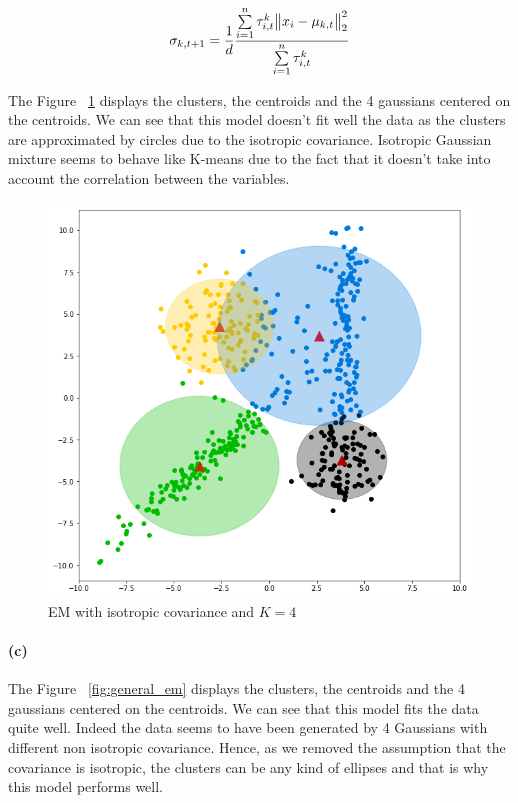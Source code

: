 \documentclass[11pt]{article}
\numberwithin{figure}{section} %
\begin{document}
\begin{framed}
\begin{align*}
\sigma_{k,t+1} = \frac{1}{d}\frac{\sum\limits_{i=1}^n \tau^{k}_{i,t} \norm{x_i - \mu_{k,t}}^2_2}{\sum\limits_{i=1}^n \tau^{k}_{i,t}}
\end{align*}
\end{framed}


The Figure ~\ref{fig:isotropic_em} displays the clusters, the centroids and the 4 gaussians centered on the centroids. We can see that this model doesn't fit well the data as the clusters are approximated by circles due to the isotropic covariance. Isotropic Gaussian mixture seems to behave like K-means due to the fact that it doesn't take into account the correlation between the variables.

\begin{figure}[H] 
	\centering
	\includegraphics[scale=0.5]{images/isotropic_em.png} %
	\caption{EM with isotropic covariance and $K=4$}
	\label{fig:isotropic_em}
\end{figure}


\paragraph{(c)}
The Figure ~\ref{fig:general_em} displays the clusters, the centroids and the 4 gaussians centered on the centroids. We can see that this model fits the data quite well. Indeed the data seems to have been generated by 4 Gaussians with different non isotropic covariance. Hence, as we removed the assumption that the covariance is isotropic, the clusters can be any kind of ellipses and that is why this model performs well.
\end{document}
